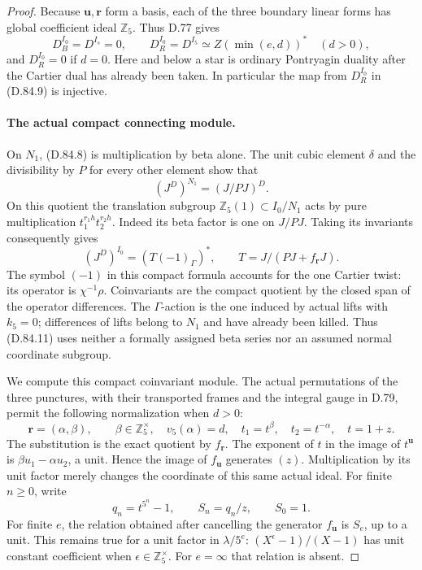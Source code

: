 \begin{proof}
Because \(\mathbf u,\mathbf r\) form a basis, each of the
three boundary linear forms has global coefficient ideal
\(\mathbb Z_5\). Thus D.77 gives
\[
 D_B^{I_0}=D^{I_s}=0,
 \qquad D_R^{I_0}=D^{I_5}\simeq Z(\min(e,d))^*
                       \quad(d>0),                              \tag{D.84.10}
\]
and \(D_R^{I_0}=0\) if \(d=0\).
Here and below a star is ordinary Pontryagin duality after
the Cartier dual has already been taken. In particular
the map from \(D_R^{I_0}\) in (D.84.9) is injective.

\paragraph{The actual compact connecting module.}
On \(N_1\), (D.84.8) is multiplication by beta alone.
The unit cubic element \(\delta\) and the divisibility by
\(P\) for every other element show that
\[
                      (J^D)^{N_1}=(J/PJ)^D.
\]
On this quotient the translation subgroup
\(\mathbb Z_5(1)\subset I_0/N_1\) acts by pure multiplication
\(t_1^{r_1h}t_2^{r_2h}\). Indeed its beta factor is one
on \(J/PJ\). Taking its invariants consequently gives
\[
 (J^D)^{I_0}=(T(-1)_\Gamma)^*,
 \qquad T=J/(PJ+f_{\mathbf r}J).                                 \tag{D.84.11}
\]
The symbol \((-1)\) in this compact formula accounts for
the one Cartier twist: its operator is \(\chi^{-1}\rho\).
Coinvariants are the compact quotient by the closed span of
the operator differences. The \(\Gamma\)-action is the one
induced by actual lifts with \(k_5=0\); differences of lifts
belong to \(N_1\) and have already been killed. Thus (D.84.11)
uses neither a formally assigned beta series nor an assumed
normal coordinate subgroup.

We compute this compact coinvariant module. The actual
permutations of the three punctures, with their transported
frames and the integral gauge in D.79, permit the following
normalization when \(d>0\):
\[
 \mathbf r=(\alpha,\beta),\qquad
 \beta\in\mathbb Z_5^\times,
 \quad v_5(\alpha)=d,
 \quad t_1=t^\beta,\quad t_2=t^{-\alpha},\quad t=1+z.
                                                                  \tag{D.84.12}
\]
The substitution is the exact quotient by \(f_{\mathbf r}\).
The exponent of \(t\) in the image of \(t^{\mathbf u}\)
is \(\beta u_1-\alpha u_2\), a unit. Hence the image of
\(f_{\mathbf u}\) generates \((z)\). Multiplication by its
unit factor merely changes the coordinate of this same
actual ideal. For finite \(n\ge0\), write
\[
 q_n=t^{5^n}-1,\qquad S_n=q_n/z,
 \qquad S_0=1.
                                                                  \tag{D.84.13}
\]
For finite \(e\), the relation obtained after cancelling
the generator \(f_{\mathbf u}\) is \(S_e\), up to a unit.
This remains true for a unit factor in \(\lambda/5^e\):
\((X^\epsilon-1)/(X-1)\) has unit constant coefficient
when \(\epsilon\in\mathbb Z_5^\times\).
For \(e=\infty\) that relation is absent.


\end{proof}
